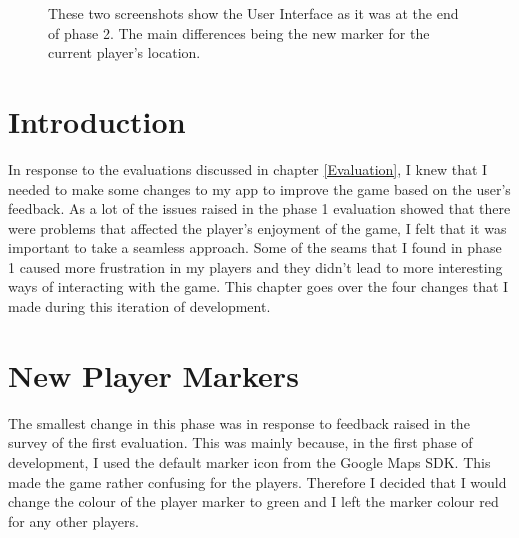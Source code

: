 \documentclass{l4proj}
\begin{document}
\begin{figure}
    \caption{These two screenshots show the User Interface as it was at the end of phase 2. The main
    differences being the new marker for the current player's location.
    }
\end{figure}

\section{Introduction}
In response to the evaluations discussed in chapter \ref{Evaluation}, I knew that I needed to make some changes to my app
to improve the game based on the user's feedback. As a lot of the issues raised in the phase 1 evaluation showed that
there were problems that affected the player's enjoyment of the game, I felt that it was important to take a seamless
approach. Some of the seams that I found in phase 1 caused more frustration in my players and they didn't lead to more
interesting ways of interacting with the game. This chapter goes over the four changes that I made during this
iteration of development.

\section{New Player Markers}
The smallest change in this phase was in response to feedback raised in the survey of the first evaluation. This was mainly
because, in the first phase of development, I used the default marker icon from the Google Maps SDK. This
made the game rather confusing for the players. Therefore I decided that I would change the colour of the player marker
to green and I left the marker colour red for any other players. 
\end{document}
